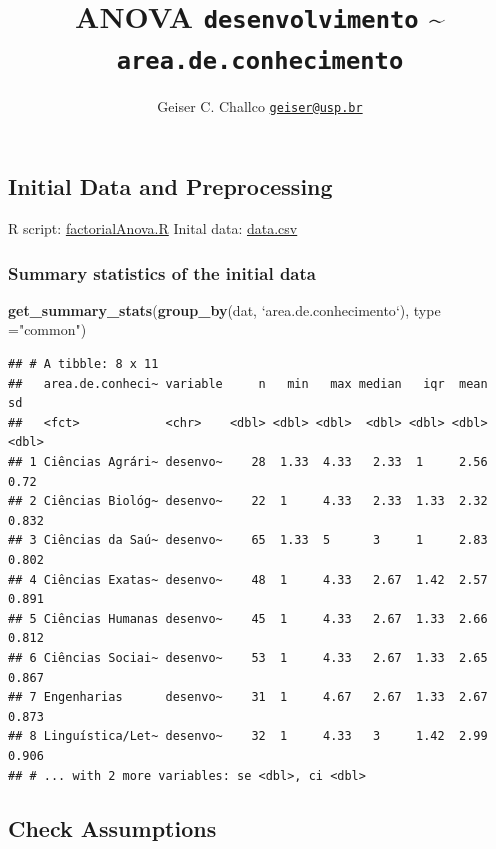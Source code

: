 \documentclass[]{article}
\title{ANOVA \texttt{desenvolvimento} \textasciitilde{}
\texttt{area.de.conhecimento}}
\author{Geiser C. Challco \href{mailto:geiser@usp.br}{\nolinkurl{geiser@usp.br}}}
\date{}
\newenvironment{Shaded}{\begin{snugshade}}{\end{snugshade}}
\newcommand{\DataTypeTok}[1]{\textcolor[rgb]{0.13,0.29,0.53}{#1}}
\newcommand{\KeywordTok}[1]{\textcolor[rgb]{0.13,0.29,0.53}{\textbf{#1}}}
\newcommand{\NormalTok}[1]{#1}
\newcommand{\StringTok}[1]{\textcolor[rgb]{0.31,0.60,0.02}{#1}}
\begin{document}
\maketitle

\hypertarget{initial-data-and-preprocessing}{%
\subsection{Initial Data and
Preprocessing}\label{initial-data-and-preprocessing}}

R script: \url{factorialAnova.R} Inital data: \url{data.csv}

\hypertarget{summary-statistics-of-the-initial-data}{%
\subsubsection{Summary statistics of the initial
data}\label{summary-statistics-of-the-initial-data}}

\begin{Shaded}
\begin{Highlighting}[]
\KeywordTok{get_summary_stats}\NormalTok{(}\KeywordTok{group_by}\NormalTok{(dat, }\StringTok{`}\DataTypeTok{area.de.conhecimento}\StringTok{`}\NormalTok{), }\DataTypeTok{type =}\StringTok{"common"}\NormalTok{)}
\end{Highlighting}
\end{Shaded}

\begin{verbatim}
## # A tibble: 8 x 11
##   area.de.conheci~ variable     n   min   max median   iqr  mean    sd
##   <fct>            <chr>    <dbl> <dbl> <dbl>  <dbl> <dbl> <dbl> <dbl>
## 1 Ciências Agrári~ desenvo~    28  1.33  4.33   2.33  1     2.56 0.72 
## 2 Ciências Biológ~ desenvo~    22  1     4.33   2.33  1.33  2.32 0.832
## 3 Ciências da Saú~ desenvo~    65  1.33  5      3     1     2.83 0.802
## 4 Ciências Exatas~ desenvo~    48  1     4.33   2.67  1.42  2.57 0.891
## 5 Ciências Humanas desenvo~    45  1     4.33   2.67  1.33  2.66 0.812
## 6 Ciências Sociai~ desenvo~    53  1     4.33   2.67  1.33  2.65 0.867
## 7 Engenharias      desenvo~    31  1     4.67   2.67  1.33  2.67 0.873
## 8 Linguística/Let~ desenvo~    32  1     4.33   3     1.42  2.99 0.906
## # ... with 2 more variables: se <dbl>, ci <dbl>
\end{verbatim}

\hypertarget{check-assumptions}{%
\subsection{Check Assumptions}\label{check-assumptions}}
\end{document}
